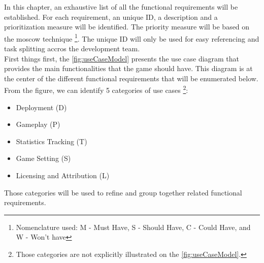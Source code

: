 
In this chapter, an exhaustive list of all the functional requirements will be established. For each requirement, an unique ID, a description and a prioritization measure will be identified. The priority measure will be based on the \gls{moscow} technique \cite{brennan2009} \footnote{Nomenclature used: M - Must Have, S - Should Have, C - Could Have, and W - Won't have}. The unique ID will only be used for easy referencing and task splitting accros the development team. \\

First things first, the \autoref{fig:useCaseModel} presents the use case diagram that provides the main functionalities that the game should have. This diagram is at the center of the different functional requirements that will be enumerated below. From the figure, we can identify 5 categories of use cases \footnote{Those categories are not explicitly illustrated on the \autoref{fig:useCaseModel}.}:
\begin{itemize}
  \item Deployment (D)
  \item Gameplay (P)
  \item Statistics Tracking (T)
  \item Game Setting (S)
  \item Licensing and Attribution (L)
\end{itemize}
Those categories will be used to refine and group together related functional requirements.

